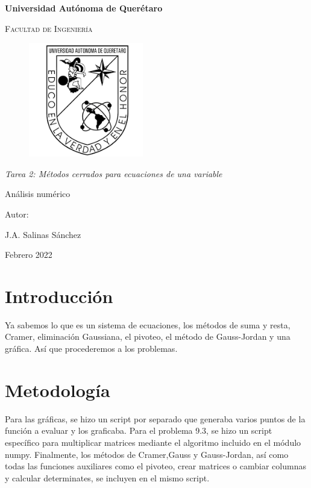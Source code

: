 \documentclass[12pt,oneside,FLEQN]{report}
\begin{document}
{
\selectfont
\begin{titlepage}
        \topmargin=0cm
        \centering

        {\bfseries\LARGE Universidad Autónoma de Querétaro \par}
        \vspace{1cm}
        {\scshape\Large  Facultad de Ingenier\'ia  \par}
        \vspace{2cm}
        \centering
        \begin{figure}[!h]
        \centering
                \includegraphics[height=5cm]{Logouaq.png}
        \end{figure}
        \vspace{3cm}
        {\itshape\large Tarea 2: Métodos cerrados para ecuaciones de una variable\par}
        \vspace{3cm}
        {\Huge Análisis numérico \par}
        \vspace{2cm}
        {\Large Autor: \par}
        {\large J.A. Salinas Sánchez \par}
        {\large Febrero 2022 \par}
\end{titlepage}
\tableofcontents
\chapter{Introducción}
Ya sabemos lo que es un sistema de ecuaciones, los métodos de suma y resta, Cramer, eliminación Gaussiana, el pivoteo, el método de Gauss-Jordan y una gráfica. Así que procederemos a los problemas.
\chapter{Metodología}
	Para las gráficas, se hizo un script por separado que generaba varios puntos de la función a evaluar y los graficaba. Para el problema 9.3, se hizo un script específico para multiplicar matrices mediante el algoritmo incluido en el módulo numpy. Finalmente, los métodos de Cramer,Gauss y Gauss-Jordan, así como todas las funciones auxiliares como el pivoteo, crear matrices o cambiar columnas y calcular determinates, se incluyen en el mismo script.
		
}
\end{document}
